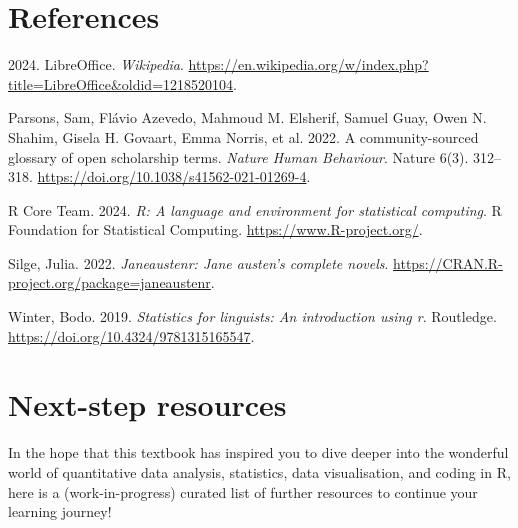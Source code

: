 \documentclass[
  letterpaper,
  DIV=11,
  numbers=noendperiod,
  oneside]{scrreprt}
\newlength{\cslhangindent}
\newenvironment{CSLReferences}[2] %
 {\begin{list}{}{%
  \setlength{\itemindent}{0pt}
  \setlength{\leftmargin}{0pt}
  \setlength{\parsep}{0pt}
  \ifodd #1
   \setlength{\leftmargin}{\cslhangindent}
   \setlength{\itemindent}{-1\cslhangindent}
  \fi
  \setlength{\itemsep}{#2\baselineskip}}}
 {\end{list}}
\begin{document}

\chapter*{References}\label{references}


\label{refs}
\begin{CSLReferences}{1}{0}
2024. LibreOffice. \emph{Wikipedia}.
\url{https://en.wikipedia.org/w/index.php?title=LibreOffice&oldid=1218520104}.

Parsons, Sam, Flávio Azevedo, Mahmoud M. Elsherif, Samuel Guay, Owen N.
Shahim, Gisela H. Govaart, Emma Norris, et al. 2022. A community-sourced
glossary of open scholarship terms. \emph{Nature Human Behaviour}.
Nature 6(3). 312--318. \url{https://doi.org/10.1038/s41562-021-01269-4}.

R Core Team. 2024. \emph{R: A language and environment for statistical
computing}. R Foundation for Statistical Computing.
\url{https://www.R-project.org/}.

Silge, Julia. 2022. \emph{Janeaustenr: Jane austen's complete novels}.
\url{https://CRAN.R-project.org/package=janeaustenr}.

Winter, Bodo. 2019. \emph{Statistics for linguists: An introduction
using r}. Routledge. \url{https://doi.org/10.4324/9781315165547}.

\end{CSLReferences}

\cleardoublepage
{}
{}
\appendix

\chapter{Next-step resources}\label{next-step-resources}

In the hope that this textbook has inspired you to dive deeper into the
wonderful world of quantitative data analysis, statistics, data
visualisation, and coding in R, here is a (work-in-progress) curated
list of further resources to continue your learning journey! 🚀✨
\end{document}
